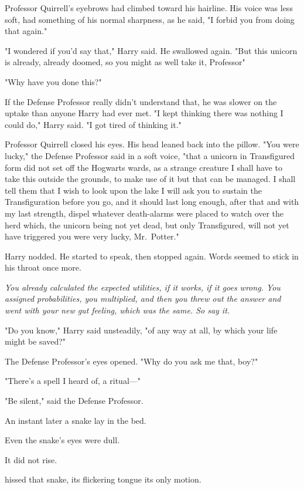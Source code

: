 Professor Quirrell's eyebrows had climbed toward his hairline. His voice was
less soft, had something of his normal sharpness, as he said, "I forbid you
from doing that again."

"I wondered if you'd say that," Harry said. He swallowed again. "But this
unicorn is already, already doomed, so you might as well take it,
Professor{\el}"

"Why have you done this?"

If the Defense Professor really didn't understand that, he was slower on the
uptake than anyone Harry had ever met. "I kept thinking there was nothing I
could do," Harry said. "I got tired of thinking it."

Professor Quirrell closed his eyes. His head leaned back into the pillow. "You
were lucky," the Defense Professor said in a soft voice, "that a unicorn in
Transfigured form{\el} did not set off the Hogwarts wards, as a strange
creature{\el} I shall have to{\el} take this outside the grounds, to make
use of it{\el} but that can be managed. I shall tell them that I wish to
look upon the lake{\el} I will ask you to sustain the Transfiguration before
you go, and it should last long enough, after that{\el} and with my last
strength, dispel whatever death-alarms were placed to watch over the
herd{\el} which, the unicorn being not yet dead, but only Transfigured, will
not yet have triggered{\el} you were very lucky, Mr.~Potter."

Harry nodded. He started to speak, then stopped again. Words seemed to stick in
his throat once more.

\emph{You already calculated the expected utilities, if it works, if it goes
wrong. You assigned probabilities, you multiplied, and then you threw out the
answer and went with your new gut feeling, which was the same. So say it.}

"Do you know," Harry said unsteadily, "of any way at all, by which your life
might be saved?"

The Defense Professor's eyes opened. "Why{\el} do you ask me that, boy?"

"There's{\el} a spell I heard of, a ritual---"

"Be silent," said the Defense Professor.

An instant later a snake lay in the bed.

Even the snake's eyes were dull.

It did not rise.

 hissed that snake, its flickering tongue its only motion.

